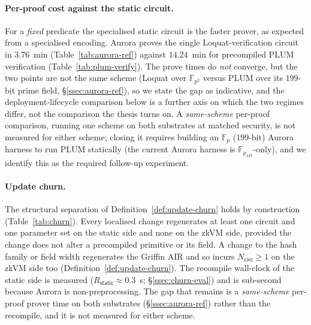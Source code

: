 \paragraph{Per-proof cost against the static circuit.}
For a \emph{fixed} predicate the specialised static circuit is the faster prover, as expected from a specialised encoding. Aurora proves the single Loquat-verification circuit in $3.76$~min (Table~\ref{tab:aurora-ref}) against $14.24$~min for precompiled PLUM verification (Table~\ref{tab:plum-verify}). The prove times do \emph{not} converge, but the two points are not the same scheme (Loquat over $\mathbb{F}_{p^2}$ versus PLUM over its $199$-bit prime field, \S\ref{ssec:aurora-ref}), so we state the gap as indicative, and the deployment-lifecycle comparison below is a further axis on which the two regimes differ, not the comparison the thesis turns on. A \emph{same-scheme} per-proof comparison, running one scheme on both substrates at matched security, is not measured for either scheme; closing it requires building an $\mathbb{F}_p$ ($199$-bit) Aurora harness to run PLUM statically (the current Aurora harness is $\mathbb{F}_{p_{127}}$-only), and we identify this as the required follow-up experiment.

\paragraph{Update churn.}
The structural separation of Definition~\ref{def:update-churn} holds by construction (Table~\ref{tab:churn}). Every localised change regenerates at least one circuit and one parameter set on the static side and none on the zkVM side, provided the change does not alter a precompiled primitive or its field. A change to the hash family or field width regenerates the Griffin AIR and so incurs $N_{\mathsf{circ}}\ge1$ on the zkVM side too (Definition~\ref{def:update-churn}). The recompile wall-clock of the static side is measured ($R_{\mathsf{static}}\approx 0.3$~s; \S\ref{ssec:churn-eval}) and is sub-second because Aurora is non-preprocessing. The gap that remains is a \emph{same-scheme} per-proof prover time on both substrates (\S\ref{ssec:aurora-ref}) rather than the recompile, and it is not measured for either scheme.

